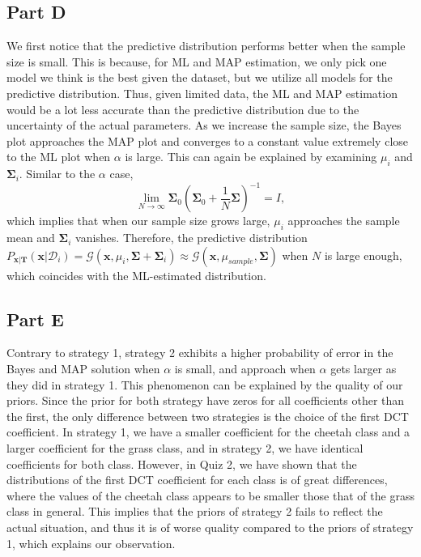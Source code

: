 \documentclass{article}
\newcommand*{\G}{\mathcal{G}}
\newcommand*{\D}{\mathcal{D}}
\begin{document}
\subsection*{Part D}

We first notice that the predictive distribution performs better when the sample size is small. This is because, for ML and MAP estimation, we only pick one model we think is the best given the dataset, but we utilize all models for the predictive distribution. Thus, given limited data, the ML and MAP estimation would be a lot less accurate than the predictive distribution due to the uncertainty of the actual parameters. As we increase the sample size, the Bayes plot approaches the MAP plot and converges to a constant value extremely close to the ML plot when $\alpha$ is large. This can again be explained by examining $\mu_i$ and $\mathbf{\Sigma}_i$. Similar to the $\alpha$ case, 
\[
    \lim\limits_{N \to \infty} \mathbf{\Sigma}_0\left(\mathbf{\Sigma}_0 + \frac{1}{N}\mathbf{\Sigma}\right)^{-1} = I,
\]
which implies that when our sample size grows large, $\mu_i$ approaches the sample mean and $\mathbf{\Sigma}_i$ vanishes. Therefore, the predictive distribution $P_{\mathbf{x}|\mathbf{T}}(\mathbf{x}|\D_i) = \G(\mathbf{x}, \mu_i, \mathbf{\Sigma} + \mathbf{\Sigma}_i) \approx \G(\mathbf{x}, \mu_{sample}, \mathbf{\Sigma})$ when $N$ is large enough, which coincides with the ML-estimated distribution.

\subsection*{Part E}

Contrary to strategy 1, strategy 2 exhibits a higher probability of error in the Bayes and MAP solution when $\alpha$ is small, and approach when $\alpha$ gets larger as they did in strategy 1. This phenomenon can be explained by the quality of our priors. Since the prior for both strategy have zeros for all coefficients other than the first, the only difference between two strategies is the choice of the first DCT coefficient. In strategy 1, we have a smaller coefficient for the cheetah class and a larger coefficient for the grass class, and in strategy 2, we have identical coefficients for both class. However, in Quiz 2, we have shown that the distributions of the first DCT coefficient for each class is of great differences, where the values of the cheetah class appears to be smaller those that of the grass class in general. This implies that the priors of strategy 2 fails to reflect the actual situation, and thus it is of worse quality compared to the priors of strategy 1, which
explains our observation.
\end{document}
